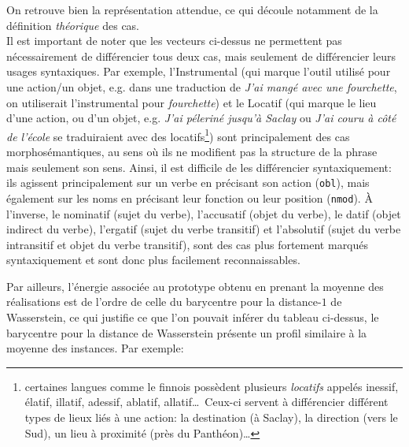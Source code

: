 \documentclass{cours}
\begin{document}
On retrouve bien la représentation attendue, ce qui découle notamment de la définition \emph{théorique} des cas. \\
Il est important de noter que les vecteurs ci-dessus ne permettent pas nécessairement de différencier tous deux cas, mais seulement de différencier leurs usages syntaxiques.
Par exemple, l'Instrumental (qui marque l'outil utilisé pour une action/un objet, e.g. dans une traduction de \textsl{J'ai mangé \emph{avec} une fourchette}, on utiliserait l'instrumental pour \textsl{fourchette})
et le Locatif (qui marque le lieu d'une action, ou d'un objet, e.g. \textsl{J'ai péleriné jusqu'à Saclay} ou \textsl{J'ai couru à côté de l'école} se traduiraient avec des
locatifs\footnote{certaines langues comme le finnois possèdent plusieurs \textit{locatifs} appelés inessif, élatif, illatif, adessif, ablatif, allatif\dots\ Ceux-ci servent à différencier différent types de lieux liés à une action: la destination (à Saclay), la direction (vers le Sud), un lieu à proximité (près du Panthéon)\ldots})
sont principalement des cas morphosémantiques, au sens où ils ne modifient pas la structure de la phrase mais seulement son sens.
Ainsi, il est difficile de les différencier syntaxiquement: ils agissent principalement sur un verbe en précisant son action (\texttt{obl}), mais également sur les noms en précisant leur fonction ou leur position (\texttt{nmod}).
À l'inverse, le nominatif (sujet du verbe), l'accusatif (objet du verbe), le datif (objet indirect du verbe), l'ergatif (sujet du verbe transitif) et l'absolutif (sujet du verbe intransitif et objet du verbe transitif), sont des cas plus fortement marqués syntaxiquement et sont donc plus facilement reconnaissables.

\medskip
Par ailleurs, l'énergie associée au prototype obtenu en prenant la moyenne des réalisations est de l'ordre de celle du barycentre pour la distance-$1$ de Wasserstein, ce qui justifie ce que l'on pouvait inférer du tableau ci-dessus, le barycentre pour la distance de Wasserstein présente un profil similaire à la moyenne des instances.
Par exemple:
\end{document}
